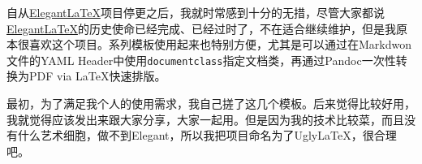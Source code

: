 自从\href{https://github.com/ElegantLaTeX/}{Elegant\LaTeX}项目停更之后，我就时常感到十分的无措，尽管大家都说\href{https://github.com/ElegantLaTeX/}{Elegant\LaTeX}的历史使命已经完成、已经过时了，不在适合继续维护，但是我原本很喜欢这个项目。系列模板使用起来也特别方便，尤其是可以通过在Markdwon文件的YAML Header中使用\texttt{documentclass}指定文档类，再通过Pandoc一次性转换为PDF via \LaTeX{}快速排版。

最初，为了满足我个人的使用需求，我自己搓了这几个模板。后来觉得比较好用，我就觉得应该发出来跟大家分享，大家一起用。但是因为我的技术比较菜，而且没有什么艺术细胞，做不到Elegant，所以我把项目命名为了Ugly\LaTeX{}，很合理吧。